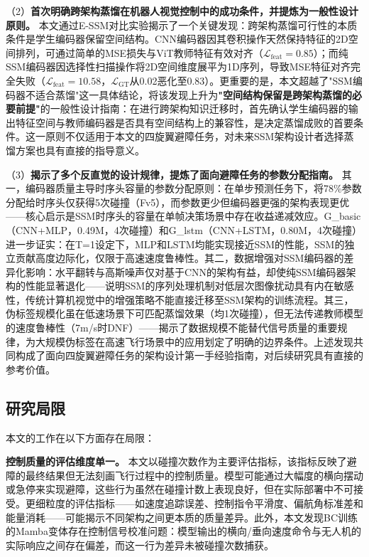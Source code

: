 \documentclass[12pt,a4paper]{article}
\numberwithin{equation}{section}
\numberwithin{figure}{section}
\numberwithin{table}{section}
\begin{document}
（2）\textbf{首次明确跨架构蒸馏在机器人视觉控制中的成功条件，并提炼为一般性设计原则。} 本文通过E-SSM对比实验揭示了一个关键发现：跨架构蒸馏可行性的本质条件是学生编码器保留空间结构。CNN编码器因其卷积操作天然保持特征的2D空间排列，可通过简单的MSE损失与ViT教师特征有效对齐（$\mathcal{L}_{\text{feat}}=0.85$）；而纯SSM编码器因选择性扫描操作将2D空间维度展平为1D序列，导致MSE特征对齐完全失败（$\mathcal{L}_{\text{feat}}=10.58$，$\mathcal{L}_{\text{GT}}$从0.02恶化至0.83）。更重要的是，本文超越了"SSM编码器不适合蒸馏"这一具体结论，将该发现上升为\textbf{"空间结构保留是跨架构蒸馏的必要前提"}的一般性设计指南：在进行跨架构知识迁移时，首先确认学生编码器的输出特征空间与教师编码器是否具有空间结构上的兼容性，是决定蒸馏成败的首要条件。这一原则不仅适用于本文的四旋翼避障任务，对未来SSM架构设计者选择蒸馏方案也具有直接的指导意义。

（3）\textbf{揭示了多个反直觉的设计规律，提炼了面向避障任务的参数分配指南。} 其一，编码器质量主导时序头容量的参数分配原则：在单步预测任务下，将78\%参数分配给时序头仅获得5次碰撞（Fv5），而参数更少但编码器更强的架构表现更优——核心启示是SSM时序头的容量在单帧决策场景中存在收益递减效应。G\_basic（CNN+MLP，0.49M，4次碰撞）和G\_lstm（CNN+LSTM，0.80M，4次碰撞）进一步证实：在T=1设定下，MLP和LSTM均能实现接近SSM的性能，SSM的独立贡献高度边际化，仅限于高速速度鲁棒性。其二，数据增强对SSM编码器的差异化影响：水平翻转与高斯噪声仅对基于CNN的架构有益，却使纯SSM编码器架构的性能显著退化——说明SSM的序列处理机制对低层次图像扰动具有内在敏感性，传统计算机视觉中的增强策略不能直接迁移至SSM架构的训练流程。其三，伪标签规模化虽在低速场景下可匹配蒸馏效果（均1次碰撞），但无法传递教师模型的速度鲁棒性（7m/s时DNF）——揭示了数据规模不能替代信号质量的重要规律，为大规模伪标签在高速飞行场景中的应用划定了明确的边界条件。上述发现共同构成了面向四旋翼避障任务的架构设计第一手经验指南，对后续研究具有直接的参考价值。

\subsection{研究局限}

本文的工作在以下方面存在局限：

\textbf{控制质量的评估维度单一。} 本文以碰撞次数作为主要评估指标，该指标反映了避障的最终结果但无法刻画飞行过程中的控制质量。模型可能通过大幅度的横向摆动或急停来实现避障，这些行为虽然在碰撞计数上表现良好，但在实际部署中不可接受。更细粒度的评估指标——如速度追踪误差、控制指令平滑度、偏航角标准差和能量消耗——可能揭示不同架构之间更本质的质量差异。此外，本文发现BC训练的Mamba变体存在控制信号校准问题：模型输出的横向/垂向速度命令与无人机的实际响应之间存在偏差，而这一行为差异未被碰撞次数捕获。
\end{document}
